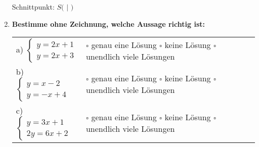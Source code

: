 \begin{enumerate}[label=\arabic*.]
    Schnittpunkt: $S($ \underline{\hspace{1cm}} $|$ \underline{\hspace{1cm}} $)$

    \vspace{1cm}

    \item \textbf{Bestimme ohne Zeichnung, welche Aussage richtig ist:}
    \vspace{0.5cm}

    \begin{tabular}{ll}
        a) $\begin{cases} y = 2x + 1 \\ y = 2x + 3 \end{cases}$ & 
        $\square$ genau eine Lösung \quad $\square$ keine Lösung \quad $\square$ unendlich viele Lösungen \\[3ex]

        b) $\begin{cases} y = x - 2 \\ y = -x + 4 \end{cases}$ & 
        $\square$ genau eine Lösung \quad $\square$ keine Lösung \quad $\square$ unendlich viele Lösungen \\[3ex]

        c) $\begin{cases} y = 3x + 1 \\ 2y = 6x + 2 \end{cases}$ & 
        $\square$ genau eine Lösung \quad $\square$ keine Lösung \quad $\square$ unendlich viele Lösungen
    \end{tabular}

\end{enumerate}